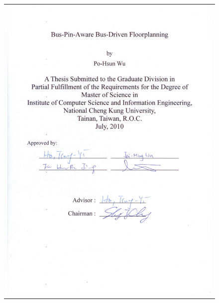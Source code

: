 \documentclass[12pt, a4paper]{report}
\begin{document}
\begin{figure}[h]
\centering
\vspace{-29mm}
\begin{tabular}{c}
\hspace{-36mm} \includegraphics[]{./ncku/oral-eng.pdf}
\end{tabular}
\end{figure}
\newpage
\newpage
\end{document}
